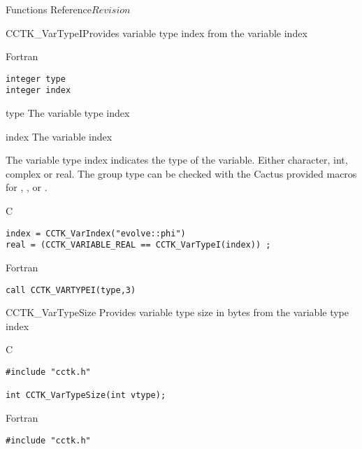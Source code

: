 \begin{cactuspart}{ Functions Reference}{}{$Revision$}
\begin{FunctionDescription}{CCTK\_VarTypeI}{Provides variable type index from the variable index}
\begin{SynopsisSection}
\begin{Synopsis}{Fortran}
\begin{verbatim}
integer type
integer index\end{verbatim}
\end{Synopsis}
\end{SynopsisSection}
\begin{ParameterSection}
\begin{Parameter}{type}
The variable type index
\end{Parameter}
\begin{Parameter}{index}
The variable index
\end{Parameter}
\end{ParameterSection}
\begin{Discussion}
The variable type index indicates the type of the variable.
Either character, int, complex or real. The group type can be checked
with the Cactus provided macros for , ,  or .
\end{Discussion}
\begin{ExampleSection}
\begin{Example}{C}
\begin{verbatim}
index = CCTK_VarIndex("evolve::phi")
real = (CCTK_VARIABLE_REAL == CCTK_VarTypeI(index)) ;
\end{verbatim}
\end{Example}
\begin{Example}{Fortran}
\begin{verbatim}
call CCTK_VARTYPEI(type,3)
\end{verbatim}
\end{Example}
\end{ExampleSection}
\end{FunctionDescription}

\begin{FunctionDescription}{CCTK\_VarTypeSize}
\label{CCTK-VarTypeSize}
Provides variable type size in bytes from the variable type index

\begin{SynopsisSection}
\begin{Synopsis}{C}
\begin{verbatim}
#include "cctk.h"

int CCTK_VarTypeSize(int vtype);
\end{verbatim}
\end{Synopsis}
\begin{Synopsis}{Fortran}
\begin{verbatim}
#include "cctk.h"


\end{verbatim}
\end{Synopsis}
\end{SynopsisSection}
\end{FunctionDescription}
\end{cactuspart}
